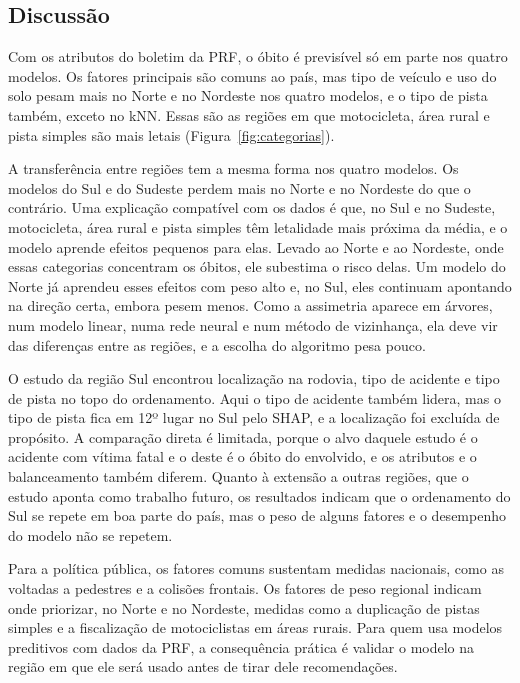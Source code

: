 \documentclass[12pt]{article}
\begin{document}
\subsection{Discussão}

Com os atributos do boletim da PRF, o óbito é previsível só em parte
nos quatro modelos. Os fatores principais são
comuns ao país, mas tipo de veículo e uso do solo pesam mais no Norte e
no Nordeste nos quatro modelos, e o tipo de pista também, exceto no
kNN. Essas são as regiões em que motocicleta, área rural e pista
simples são mais letais (Figura~\ref{fig:categorias}).

A transferência entre regiões tem a mesma forma nos quatro modelos. Os
modelos do Sul e do Sudeste perdem mais no Norte e no Nordeste do que o
contrário. Uma explicação compatível com os dados é que, no Sul e no
Sudeste, motocicleta, área rural e pista simples têm letalidade mais
próxima da média, e o modelo aprende efeitos pequenos para elas. Levado
ao Norte e ao Nordeste, onde essas categorias concentram os óbitos, ele
subestima o risco delas. Um modelo do
Norte já aprendeu esses efeitos com peso alto e, no Sul, eles continuam
apontando na direção certa, embora pesem menos. Como a assimetria
aparece em árvores, num modelo linear, numa rede neural e num método de
vizinhança, ela deve vir das diferenças entre as regiões, e a escolha
do algoritmo pesa pouco.

O estudo da região Sul \cite{gabardo2025} encontrou localização na
rodovia, tipo de acidente e tipo de pista no topo do ordenamento. Aqui o
tipo de acidente também lidera, mas o tipo de pista fica em 12º lugar
no Sul pelo SHAP, e a localização foi excluída de propósito. A comparação
direta é limitada, porque o alvo daquele estudo é o acidente com vítima
fatal e o deste é o óbito do envolvido, e os atributos e o
balanceamento também diferem. Quanto à extensão a outras regiões, que o
estudo aponta como trabalho futuro, os resultados indicam que o
ordenamento do Sul se repete em boa parte do país, mas o peso de alguns
fatores e o desempenho do modelo não se repetem.

Para a política pública, os fatores comuns sustentam medidas nacionais,
como as voltadas a pedestres e a colisões frontais. Os fatores de peso
regional indicam onde priorizar, no Norte e no Nordeste, medidas como a
duplicação de pistas simples e a fiscalização de motociclistas em áreas
rurais. Para quem usa modelos preditivos com dados da PRF, a
consequência prática é validar o modelo na região em que ele será usado
antes de tirar dele recomendações.
\end{document}
